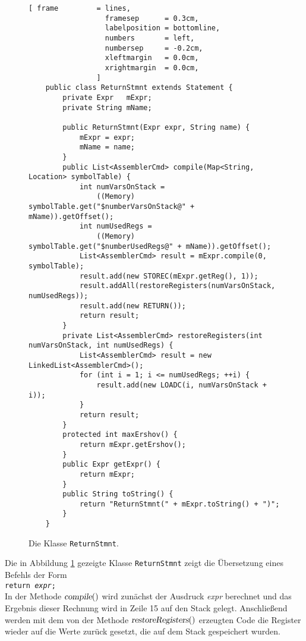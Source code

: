 \begin{figure}[!ht]
\centering
\begin{Verbatim}[ frame         = lines, 
                  framesep      = 0.3cm, 
                  labelposition = bottomline,
                  numbers       = left,
                  numbersep     = -0.2cm,
                  xleftmargin   = 0.0cm,
                  xrightmargin  = 0.0cm,
                ]
    public class ReturnStmnt extends Statement {
        private Expr   mExpr;
    	private String mName;
    
        public ReturnStmnt(Expr expr, String name) {
            mExpr = expr;
            mName = name;
        }
        public List<AssemblerCmd> compile(Map<String, Location> symbolTable) {
            int numVarsOnStack = 
                ((Memory) symbolTable.get("$numberVarsOnStack@" + mName)).getOffset();
            int numUsedRegs = 
                ((Memory) symbolTable.get("$numberUsedRegs@" + mName)).getOffset();
            List<AssemblerCmd> result = mExpr.compile(0, symbolTable);
            result.add(new STOREC(mExpr.getReg(), 1));
            result.addAll(restoreRegisters(numVarsOnStack, numUsedRegs));
            result.add(new RETURN());
            return result;
        }
        private List<AssemblerCmd> restoreRegisters(int numVarsOnStack, int numUsedRegs) {
            List<AssemblerCmd> result = new LinkedList<AssemblerCmd>();
            for (int i = 1; i <= numUsedRegs; ++i) {
                result.add(new LOADC(i, numVarsOnStack + i));
            }
            return result;
        }
        protected int maxErshov() {
            return mExpr.getErshov();
        }
        public Expr getExpr() {
            return mExpr;
        }
        public String toString() {
            return "ReturnStmnt(" + mExpr.toString() + ")";
        }
    }
\end{Verbatim}
\vspace*{-0.3cm}
\caption{Die Klasse \texttt{ReturnStmnt}.}
\label{fig:ReturnStmnt.java-SRP}
\end{figure}

\noindent
Die  in Abbildung \ref{fig:ReturnStmnt.java-SRP} gezeigte Klasse \texttt{ReturnStmnt}
zeigt die \"Ubersetzung eines Befehls der Form 
\\[0.2cm]
\hspace*{1.3cm}
\texttt{return \textsl{expr};} 
\\[0.2cm]
In der Methode $\textsl{compile}()$ wird zun\"achst der Ausdruck \textsl{expr} berechnet und
das Ergebnis dieser Rechnung wird in Zeile 15 auf den Stack gelegt.
Anschlie{\ss}end werden mit dem von der Methode $\textsl{restoreRegisters}()$ erzeugten Code
die Register wieder auf die Werte zur\"uck gesetzt, die auf dem Stack gespeichert wurden.


